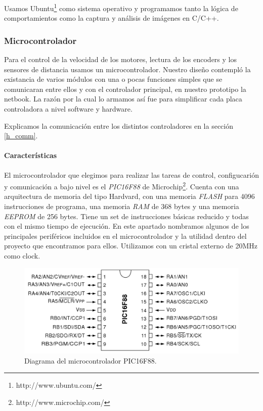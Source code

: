 Usamos Ubuntu\footnote{http://www.ubuntu.com/} como sistema operativo y programamos tanto la l\'ogica de comportamientos
como la captura y an\'alisis de im\'agenes en C/C++.

\subsubsection{Microcontrolador}
\label{h_controlador_micro}

Para el control de la velocidad de los motores, lectura de los encoders y los sensores de distancia usamos un
microcontrolador.
Nuestro dise\~no contempl\'o la existancia de varios m\'odulos con una o pocas funciones simples que se comunicaran
entre ellos y con el controlador principal, en nuestro prototipo la netbook.
La raz\'on por la cual lo armamos as\'i fue para simplificar cada placa controladora a nivel software y hardware.

Explicamos la comunicaci\'on entre los distintos controladores en la secci\'on \ref{h_comm}.

\paragraph{Caracter\'isticas}
\label{h_controlador_micro_caracteristicas}

El microcontrolador que elegimos para realizar las tareas de control, configucari\'on y comunicaci\'on a bajo nivel
es el \emph{PIC16F88} de Microchip\footnote{http://www.microchip.com/}.
Cuenta con una arquitectura de memoria del tipo Hardvard, con una memoria \emph{FLASH} para 4096 instrucciones de
programa, una memoria \emph{RAM} de 368 bytes y una memoria \emph{EEPROM} de 256 bytes.
Tiene un set de instrucciones b\'asicas reducido y todas con el mismo tiempo de ejecuci\'on.
En este apartado nombramos algunos de los principales perif\'ericos incluidos en el microcontrolador y la utilidad
dentro del proyecto que encontramos para ellos.
Utilizamos con un cristal externo de 20MHz como clock.

\begin{figure}[ht]
	\centering
	\includegraphics[scale=0.20]{figuras/pic16f88.png}
	\caption{Diagrama del microcontrolador PIC16F88.}
	\label{hF_pic16f88_diagrama}
\end{figure}

